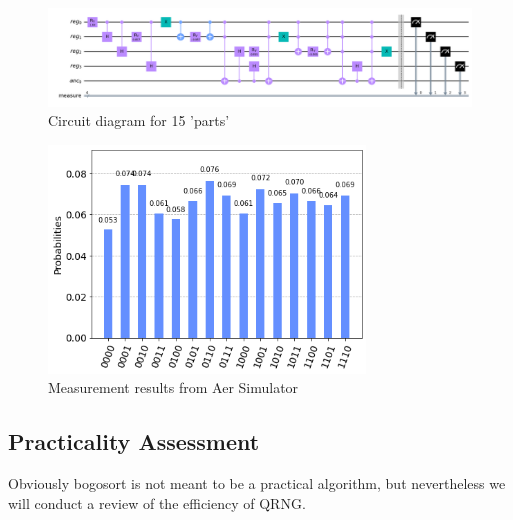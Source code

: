 \documentclass[12pt]{article}
\begin{document}
\begin{figure}[h]
    \centering
    \includegraphics[width=\textwidth]{images/example_circuit.png}
    \caption{Circuit diagram for 15 'parts'}
\end{figure}
\begin{figure}[h]
    \centering
    \includegraphics[width=0.75\textwidth]{images/example_measurement.png}
    \caption{Measurement results from Aer Simulator}
    \label{fig:measures}
\end{figure}

\subsection{Practicality Assessment}
Obviously bogosort is not meant to be a practical algorithm, but nevertheless we will conduct a review of the efficiency of QRNG.
\end{document}
